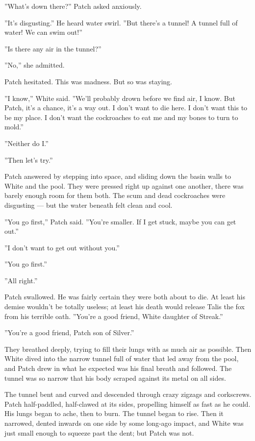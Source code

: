 \documentclass[12pt]{book}
\begin{document}
''What's down there?'' Patch asked anxiously.

''It's disgusting.'' He heard water swirl. ''But there's a tunnel! A
tunnel full of water! We can swim out!''

''Is there any air in the tunnel?''

''No,'' she admitted.

Patch hesitated. This was madness. But so was staying.

''I know,'' White said. ''We'll probably drown before we find air, I
know. But Patch, it's a chance, it's a way out. I don't want to die
here. I don't want this to be my place. I don't want the cockroaches
to eat me and my bones to turn to mold.''

''Neither do I.''

''Then let's try.''

Patch answered by stepping into space, and sliding down the basin
walls to White and the pool. They were pressed right up against one
another, there was barely enough room for them both. The scum and dead
cockroaches were disgusting --- but the water beneath felt clean and
cool.

''You go first,'' Patch said. ''You're smaller. If I get stuck, maybe
you can get out.''

''I don't want to get out without you.''

''You go first.''

''All right.''

Patch swallowed. He was fairly certain they were both about to die. At
least his demise wouldn't be totally useless; at least his death would
release Talis the fox from his terrible oath. ''You're a good friend,
White daughter of Streak.''

''You're a good friend, Patch son of Silver.''

They breathed deeply, trying to fill their lungs with as much air as
possible. Then White dived into the narrow tunnel full of water that
led away from the pool, and Patch drew in what he expected was his
final breath and followed. The tunnel was so narrow that his body
scraped against its metal on all sides.

The tunnel bent and curved and descended through crazy zigzags and
corkscrews. Patch half-paddled, half-clawed at its sides, propelling
himself as fast as he could. His lungs began to ache, then to
burn. The tunnel began to rise. Then it narrowed, dented inwards on
one side by some long-ago impact, and White was just small enough to
squeeze past the dent; but Patch was not.
\end{document}
